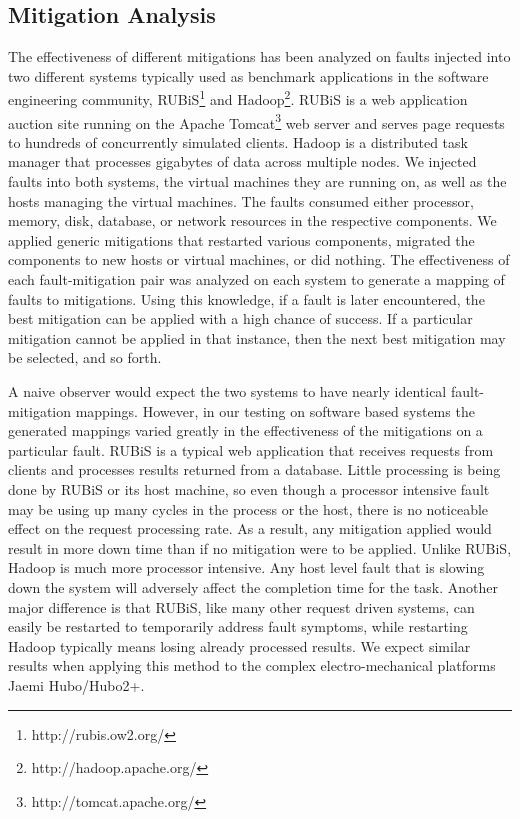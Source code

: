 \subsection{Mitigation Analysis}\label{sub:mitigationanalysis}
The effectiveness of different mitigations has been analyzed on faults injected into two different systems typically used as benchmark applications in the software engineering community, RUBiS\footnote{http://rubis.ow2.org/} and Hadoop\footnote{http://hadoop.apache.org/}. RUBiS is a web application auction site running on the Apache Tomcat\footnote{http://tomcat.apache.org/} web server and serves page requests to hundreds of concurrently simulated clients. Hadoop is a distributed task manager that processes gigabytes of data across multiple nodes. We injected faults into both systems, the virtual machines they are running on, as well as the hosts managing the virtual machines. The faults consumed either processor, memory, disk, database, or network resources in the respective components. We applied generic mitigations that restarted various components, migrated the components to new hosts or virtual machines, or did nothing. The effectiveness of each fault-mitigation pair was analyzed on each system to generate a mapping of faults to mitigations. Using this knowledge, if a fault is later encountered, the best mitigation can be applied with a high chance of success. If a particular mitigation cannot be applied in that instance, then the next best mitigation may be selected, and so forth.


A naive observer would expect the two systems to have nearly identical fault-mitigation mappings. However, in our testing on software based systems the generated mappings varied greatly in the effectiveness of the mitigations on a particular fault.  RUBiS is a typical web application that receives requests from clients and processes results returned from a database. Little processing is being done by RUBiS or its host machine, so even though a processor intensive fault may be using up many cycles in the process or the host, there is no noticeable effect on the request processing rate. As a result, any mitigation applied would result in more down time than if no mitigation were to be applied. Unlike RUBiS, Hadoop is much more processor intensive. Any host level fault that is slowing down the system will adversely affect the completion time for the task. Another major difference is that RUBiS, like many other request driven systems, can easily be restarted to temporarily address fault symptoms, while restarting Hadoop typically means losing already processed results.  We expect similar results when applying this method to the complex electro-mechanical platforms Jaemi Hubo/Hubo2+.

